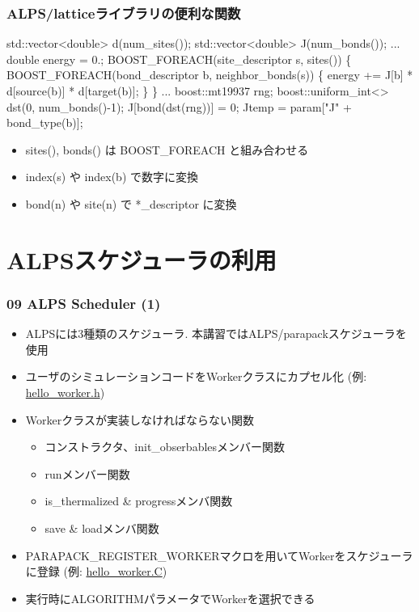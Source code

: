 \begin{frame}[fragile,shrink=10] \frametitle{ALPS/latticeライブラリの便利な関数}
\begin{semiverbatim}
std::vector<double> d(\alert{num_sites()});
std::vector<double> J(\alert{num_bonds()});
...
double energy = 0.;
BOOST\_FOREACH(site_descriptor s, \alert{sites()}) \{
  BOOST\_FOREACH(bond_descriptor b, \alert{neighbor_bonds(s)}) \{
    energy += J[b] * d[\alert{source(b)}] * d[\alert{target(b)}];
  \}
\}
...
boost::mt19937 rng;
boost::uniform_int<> dst(0, \alert{num_bonds()}-1);
J[\alert{bond(dst(rng))}] = 0;
Jtemp = param["J" + \alert{bond_type(b)}];
\end{semiverbatim}
  \begin{itemize}
  \item sites(), bonds() は BOOST\_FOREACH と組み合わせる
  \item index(s) や index(b) で数字に変換
  \item bond(n) や site(n) で *\_descriptor に変換
  \end{itemize}
\end{frame}

\section{ALPSスケジューラの利用}
\begin{frame}[fragile]
  \frametitle{09 ALPS Scheduler (1)}
  \begin{itemize}
    \item ALPSには3種類のスケジューラ. 本講習ではALPS/parapackスケジューラを使用
    \item ユーザのシミュレーションコードをWorkerクラスにカプセル化 (例: \href{https://github.com/cmsi/alps-tutorial/blob/develop/alpsize/09-hello_worker.h}{hello\_worker.h})
    \item Workerクラスが実装しなければならない関数
      \begin{itemize}
        \item コンストラクタ、init\_obserbablesメンバー関数
        \item runメンバー関数
        \item is\_thermalized \& progressメンバ関数
        \item save \& loadメンバ関数
      \end{itemize}
    \item PARAPACK\_REGISTER\_WORKERマクロを用いてWorkerをスケジューラに登録 (例: \href{https://github.com/cmsi/alps-tutorial/blob/develop/alpsize/09-hello_worker.C}{hello\_worker.C})
    \item 実行時にALGORITHMパラメータでWorkerを選択できる
  \end{itemize}
\end{frame}

